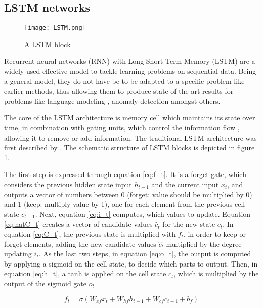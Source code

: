 \subsection{LSTM networks \label{sec:lstm}}
\begin{figure}[h]
  \centering
  \texttt{[image: LSTM.png]}\\
  \caption{A LSTM block \cite{graves2013speech}}
  \label{fig:lstm_blocks}
\end{figure}


Recurrent neural networks (RNN) with Long Short-Term Memory (LSTM) are a widely-used effective model to tackle learning problems on sequential data. Being a general model, they do not have be to be adapted to a specific problem like earlier methods, thus allowing them to produce state-of-the-art results for problems like language modeling \cite{peters2018deep}, anomaly detection \cite{du2017deeplog} amongst others.

The core of the LSTM architecture is memory cell which maintains its state over time, in combination with gating units, which control the information flow \cite{greff2016lstm}, allowing it to remove or add information. The traditional LSTM architecture was first described by \cite{graves2005framewise}. The schematic structure of LSTM blocks is depicted in figure \ref{fig:lstm_blocks}. 

The first step is expressed through equation \ref{eq:f_t}. It is a forget gate, which considers the previous hidden state input $h_{t-1}$ and the current input $x_t$, and outputs a vector of numbers between 0 (forget: value should be multiplied by 0) and 1 (keep: multiply value by 1), one for each element from the previous cell state $c_{t-1}$. Next, equation \ref{eq:i_t} computes, which values to update. Equation \ref{eq:hatC_t} creates a vector of candidate values $\hat{c}_t$ for the new state $c_t$. In equation \ref{eq:C_t}, the previous state is multiplied with $f_t$, in order to keep or forget elements, adding the new candidate values $\hat{c}_t$ multiplied by the degree updating $i_t$. As the last two steps, in equation \ref{eq:o_t}, the output is computed by applying a sigmoid on the cell state, to decide which parts to output. Then, in equation \ref{eq:h_t}, a tanh is applied on the cell state $c_t$, which is multiplied by the output of the sigmoid gate $o_t$ \cite{colahlstm} \cite{graves2013speech}.

\begin{equation} \label{eq:f_t}
	f_t = \sigma(W_{xf}x_t + W_{hf}h_{t-1} + W_{cf}c_{t-1} + b_f)
\end{equation}

